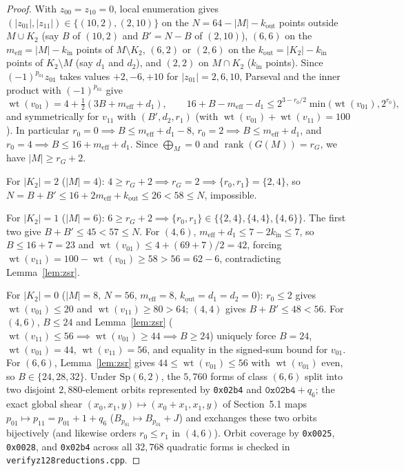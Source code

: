 \documentclass[11pt]{article}
\theoremstyle{definition}
\theoremstyle{remark}
\newcommand{\wt}{\operatorname{wt}}
\newcommand{\rank}{\operatorname{rank}}
\newcommand{\code}[1]{\texttt{#1}}
\DeclareRobustCommand{\_}{\textunderscore\allowbreak}
\begin{document}
\begin{proof}
With $z_{00}=z_{10}=0$, local enumeration gives $(|z_{01}|,|z_{11}|)\in\{(10,2),(2,10)\}$ on the $N=64-|M|-k_{\mathrm{out}}$ points outside $M\cup K_2$ (say $B$ of $(10,2)$ and $B'=N-B$ of $(2,10)$), $(6,6)$ on the $m_{\mathrm{eff}}=|M|-k_{\mathrm{in}}$ points of $M\setminus K_2$, $(6,2)$ or $(2,6)$ on the $k_{\mathrm{out}}=|K_2|-k_{\mathrm{in}}$ points of $K_2\setminus M$ (say $d_1$ and $d_2$), and $(2,2)$ on $M\cap K_2$ ($k_{\mathrm{in}}$ points). Since $(-1)^{p_{01}}z_{01}$ takes values $+2,-6,+10$ for $|z_{01}|=2,6,10$, Parseval and the inner product with $(-1)^{p_{01}}$ give
\[
  \wt(v_{01})=4+\tfrac12(3B+m_{\mathrm{eff}}+d_1),\qquad
  16+B-m_{\mathrm{eff}}-d_1\le 2^{3-r_0/2}\min\!\big(\wt(v_{01}),2^{r_0}\big),
\]
and symmetrically for $v_{11}$ with $(B',d_2,r_1)$ (with $\wt(v_{01})+\wt(v_{11})=100$). In particular $r_0=0\implies B\le m_{\mathrm{eff}}+d_1-8$, $r_0=2\implies B\le m_{\mathrm{eff}}+d_1$, and $r_0=4\implies B\le16+m_{\mathrm{eff}}+d_1$. Since $\bigoplus_M=0$ and $\rank(G(M))=r_G$, we have $|M|\ge r_G+2$.

For $|K_2|=2$ ($|M|=4$): $4\ge r_G+2\implies r_G=2\implies\{r_0,r_1\}=\{2,4\}$, so $N=B+B'\le16+2m_{\mathrm{eff}}+k_{\mathrm{out}}\le26<58\le N$, impossible.

For $|K_2|=1$ ($|M|=6$): $6\ge r_G+2\implies\{r_0,r_1\}\in\{\{2,4\},\{4,4\},\{4,6\}\}$. The first two give $B+B'\le45<57\le N$. For $(4,6)$, $m_{\mathrm{eff}}+d_1\le7-2k_{\mathrm{in}}\le7$, so $B\le16+7=23$ and $\wt(v_{01})\le4+(69+7)/2=42$, forcing $\wt(v_{11})=100-\wt(v_{01})\ge58>56=62-6$, contradicting Lemma~\ref{lem:zsr}.

For $|K_2|=0$ ($|M|=8$, $N=56$, $m_{\mathrm{eff}}=8$, $k_{\mathrm{out}}=d_1=d_2=0$): $r_0\le2$ gives $\wt(v_{01})\le20$ and $\wt(v_{11})\ge80>64$; $(4,4)$ gives $B+B'\le48<56$. For $(4,6)$, $B\le24$ and Lemma~\ref{lem:zsr} ($\wt(v_{11})\le56\implies\wt(v_{01})\ge44\implies B\ge24$) uniquely force $B=24$, $\wt(v_{01})=44$, $\wt(v_{11})=56$, and equality in the signed-sum bound for $v_{01}$. For $(6,6)$, Lemma~\ref{lem:zsr} gives $44\le\wt(v_{01})\le56$ with $\wt(v_{01})$ even, so $B\in\{24,28,32\}$. Under $\mathrm{Sp}(6,2)$, the $5{,}760$ forms of class $(6,6)$ split into two disjoint $2{,}880$-element orbits represented by \code{0x02b4} and $\code{0x02b4}+q_6$; the exact global shear $(x_0,x_1,y)\mapsto(x_0+x_1,x_1,y)$ of Section~5.1 maps $p_{01}\mapsto p_{11}=p_{01}+1+q_6$ ($B_{p_{01}}\mapsto B_{p_{01}}+J$) and exchanges these two orbits bijectively (and likewise orders $r_0\le r_1$ in $(4,6)$). Orbit coverage by \code{0x0025}, \code{0x0028}, and \code{0x02b4} across all $32{,}768$ quadratic forms is checked in \code{verify\_z128\_reductions.cpp}.
\end{proof}
\end{document}
